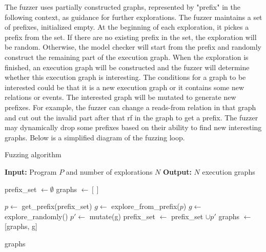 The fuzzer uses partially constructed graphs, represented by "prefix" in the following context, as guidance for further explorations. 
The fuzzer maintains a set of prefixes, initialized empty. At the beginning of each exploration, it pickes a prefix from the set. If there are no existing prefix in the set, the exploration will be random. Otherwise, the model checker will start from the prefix and randomly construct the remaining part of the execution graph. When the exploration is finished, an execution graph will be constructed and the fuzzer will determine whether this execution graph is interesting. The conditions for a graph to be interested could be that it is a new execution graph or it contains some new relations or events. The interested graph will be mutated to generate new prefixes. For example, the fuzzer can change a reads-from relation in that graph and cut out the invalid part after that rf in the graph to get a prefix. The fuzzer may dynamically drop some prefixes based on their ability to find new interesting graphs. Below is a simplified diagram of the fuzzing loop.



\begin{algorithm}
    \caption{Fuzzing algorithm}
    \label{fuzzer}
    \begin{algorithmic}[1]
    \STATE \textbf{Input:} Program $P$ and number of explorations $N$
    \STATE \textbf{Output:} $N$ execution graphs
    
    \STATE prefix\_set $\leftarrow \emptyset$
    \STATE graphs $\leftarrow [ ]$
    
            \STATE $p \leftarrow$ get\_prefix(prefix\_set)
            \STATE $g \leftarrow $ explore\_from\_prefix($p$)
        \ELSE 
            \STATE $g \leftarrow $ explore\_randomly()
        \ENDIF 
            \STATE $p' \leftarrow$ mutate(g)
            \STATE prefix\_set $\leftarrow$ prefix\_set $\cup p'$        
        \ENDIF
        \STATE graphs $\leftarrow$ [graphs, g]
    \ENDFOR
    
    \RETURN graphs
    \end{algorithmic}
\end{algorithm}










